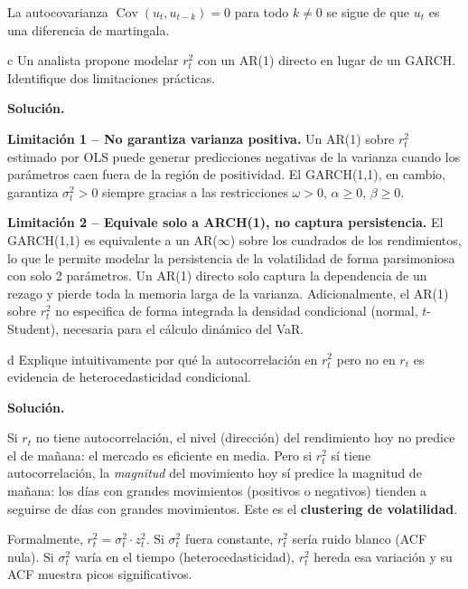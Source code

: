 \documentclass[11pt,a4paper]{article}
\newcommand{\Cov}{\operatorname{Cov}}
\newcommand{\sigmat}{\sigma^2_t}
\begin{document}
La autocovarianza $\Cov(u_t, u_{t-k})=0$ para todo $k \neq 0$ se sigue de que $u_t$ es una diferencia de martingala.

\begin{cajaInciso}{c}
Un analista propone modelar $r_t^2$ con un AR(1) directo en lugar de un GARCH. Identifique dos limitaciones prácticas.
\end{cajaInciso}

\textbf{Solución.}

\textbf{Limitación 1 -- No garantiza varianza positiva.} Un AR(1) sobre $r_t^2$ estimado por OLS puede generar predicciones negativas de la varianza cuando los parámetros caen fuera de la región de positividad. El GARCH(1,1), en cambio, garantiza $\sigmat > 0$ siempre gracias a las restricciones $\omega>0$, $\alpha\geq 0$, $\beta\geq 0$.

\textbf{Limitación 2 -- Equivale solo a ARCH(1), no captura persistencia.} El GARCH(1,1) es equivalente a un AR($\infty$) sobre los cuadrados de los rendimientos, lo que le permite modelar la persistencia de la volatilidad de forma parsimoniosa con solo 2 parámetros. Un AR(1) directo solo captura la dependencia de un rezago y pierde toda la memoria larga de la varianza. Adicionalmente, el AR(1) sobre $r_t^2$ no especifica de forma integrada la densidad condicional (normal, $t$-Student), necesaria para el cálculo dinámico del VaR.

\begin{cajaInciso}{d}
Explique intuitivamente por qué la autocorrelación en $r_t^2$ pero no en $r_t$ es evidencia de heterocedasticidad condicional.
\end{cajaInciso}

\textbf{Solución.}

Si $r_t$ no tiene autocorrelación, el nivel (dirección) del rendimiento hoy no predice el de mañana: el mercado es eficiente en media. Pero si $r_t^2$ sí tiene autocorrelación, la \emph{magnitud} del movimiento hoy sí predice la magnitud de mañana: los días con grandes movimientos (positivos o negativos) tienden a seguirse de días con grandes movimientos. Este es el \textbf{clustering de volatilidad}.

Formalmente, $r_t^2 = \sigmat \cdot z_t^2$. Si $\sigmat$ fuera constante, $r_t^2$ sería ruido blanco (ACF nula). Si $\sigmat$ varía en el tiempo (heterocedasticidad), $r_t^2$ hereda esa variación y su ACF muestra picos significativos.
\end{document}
